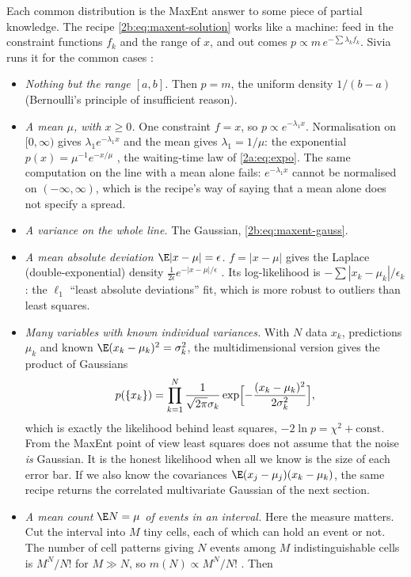 Each common distribution is the MaxEnt answer to some piece of partial knowledge. The recipe \eqref{2b:eq:maxent-solution} works like a machine: feed in the constraint functions $f_k$ and the range of $x$, and out comes $p\propto m\,e^{-\sum\lambda_kf_k}$. Sivia runs it for the common cases :
\begin{itemize}
  \item \emph{Nothing but the range $[a,b]$.} Then $p=m$, the uniform density $1/(b-a)$ (Bernoulli's principle of insufficient reason).
  \item \emph{A mean $\mu$, with $x\ge0$.} One constraint $f=x$, so $p\propto e^{-\lambda_1x}$. Normalisation on $[0,\infty)$ gives $\lambda_1e^{-\lambda_1x}$ and the mean gives $\lambda_1=1/\mu$: the exponential $p(x)=\mu^{-1}e^{-x/\mu}$ , the waiting-time law of \eqref{2a:eq:expo}. The same computation on the line with a mean alone fails: $e^{-\lambda_1x}$ cannot be normalised on $(-\infty,\infty)$, which is the recipe's way of saying that a mean alone does not specify a spread.
  \item \emph{A variance on the whole line.} The Gaussian, \eqref{2b:eq:maxent-gauss}.
  \item \emph{A mean absolute deviation $\E|x-\mu|=\epsilon$.} $f=|x-\mu|$ gives the Laplace (double-exponential) density $\frac{1}{2\epsilon}e^{-|x-\mu|/\epsilon}$ . Its log-likelihood is $-\sum|x_k-\mu_k|/\epsilon_k$: the $\ell_1$ ``least absolute deviations'' fit, which is more robust to outliers than least squares.
  \item \emph{Many variables with known individual variances.} With $N$ data $x_k$, predictions $\mu_k$ and known $\E(x_k-\mu_k)^2=\sigma_k^2$, the multidimensional version gives the product of Gaussians 
  \begin{equation}
    p(\{x_k\})=\prod_{k=1}^N\frac{1}{\sqrt{2\pi}\sigma_k}\exp\Bigl[-\frac{(x_k-\mu_k)^2}{2\sigma_k^2}\Bigr],
    \label{2b:eq:maxent-lsq}
  \end{equation}
  which is exactly the likelihood behind least squares, $-2\ln p=\chi^2+\text{const}$. From the MaxEnt point of view least squares does not assume that the noise \emph{is} Gaussian. It is the honest likelihood when all we know is the size of each error bar. If we also know the covariances $\E(x_j-\mu_j)(x_k-\mu_k)$, the same recipe returns the correlated multivariate Gaussian of the next section.
  \item \emph{A mean count $\E N=\mu$ of events in an interval.} Here the measure matters. Cut the interval into $M$ tiny cells, each of which can hold an event or not. The number of cell patterns giving $N$ events among $M$ indistinguishable cells is $M^N/N!$ for $M\gg N$, so $m(N)\propto M^N/N!$ . Then

\end{itemize}
